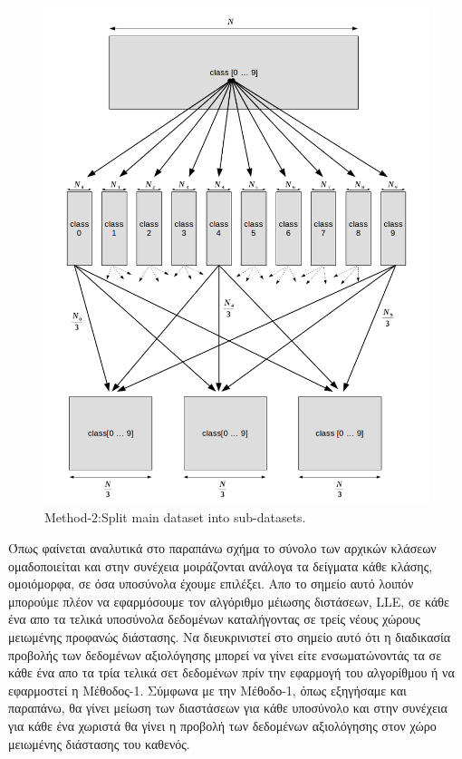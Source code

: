 \newpage
\begin{figure}[t!]
\centering
\includegraphics[scale=0.8]{figs/6.png}
\newline
\caption{ \textlatin{Method-2:Split main dataset into sub-datasets}.} 
\end{figure}
\newpage
\par
Όπως φαίνεται αναλυτικά στο παραπάνω σχήμα το σύνολο των αρχικών κλάσεων ομαδοποιείται και στην συνέχεια μοιράζονται ανάλογα τα δείγματα κάθε κλάσης, ομοιόμορφα, σε όσα υποσύνολα έχουμε επιλέξει. Απο το σημείο αυτό λοιπόν μπορούμε πλέον να εφαρμόσουμε τον αλγόριθμο μέιωσης διστάσεων, \textlatin{LLE}, σε κάθε ένα απο τα τελικά υποσύνολα δεδομένων καταλήγοντας σε τρείς νέους χώρους μειωμένης προφανώς διάστασης. Να διευκρινιστεί στο σημείο αυτό ότι η διαδικασία προβολής των δεδομένων αξιολόγησης μπορεί να γίνει είτε ενσωματώνοντάς τα σε κάθε ένα απο τα τρία τελικά σετ δεδομένων πρίν την εφαρμογή του αλγορίθμου ή να εφαρμοστεί η Μέθοδος-1. Σύμφωνα με την Μέθοδο-1, όπως εξηγήσαμε και παραπάνω, θα γίνει μείωση των διαστάσεων για κάθε υποσύνολο και στην συνέχεια για κάθε ένα χωριστά θα γίνει η προβολή των δεδομένων αξιολόγησης στον χώρο μειωμένης διάστασης του καθενός. 
